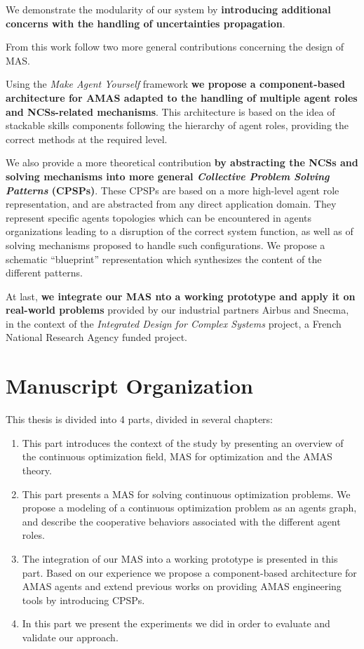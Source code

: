 We demonstrate the modularity of our system by \textbf{introducing additional concerns with the handling of uncertainties propagation}.

From this work follow two more general contributions concerning the design of MAS.

Using the \emph{Make Agent Yourself} framework \textbf{we propose a component-based architecture for AMAS adapted to the handling of multiple agent roles and NCSs-related mechanisms}. This architecture is based on the idea of stackable skills components following the hierarchy of agent roles, providing the correct methods at the required level.

We also provide a more theoretical contribution \textbf{by abstracting the NCSs and solving mechanisms into more general \textit{Collective Problem Solving Patterns} (CPSPs)}. These CPSPs are based on a more high-level agent role representation, and are abstracted from any direct application domain. They represent specific agents topologies which can be encountered in agents organizations leading to a disruption of the correct system function, as well as of solving mechanisms proposed to handle such configurations. We propose a schematic \enquote{blueprint} representation which synthesizes the content of the different patterns.

At last, \textbf{we integrate our MAS nto a working prototype and apply it on real-world problems} provided by our industrial partners Airbus and Snecma, in the context of the \emph{Integrated Design for Complex Systems} project, a French National Research Agency funded project.

\newpage
\section*{Manuscript Organization}

This thesis is divided into 4 parts, divided in several chapters:
\begin{enumerate}[P{a}rt I.] %
\item This part introduces the context of the study by presenting an overview of the continuous optimization field, MAS for optimization and the AMAS theory.
\item This part presents a MAS for solving continuous optimization problems. We propose a modeling of a continuous optimization problem as an agents graph, and describe the cooperative behaviors associated with the different agent roles.
\item The integration of our MAS into a working prototype is presented in this part. Based on our experience we propose a component-based architecture for AMAS agents and extend previous works on providing AMAS engineering tools by introducing CPSPs.
\item In this part we present the experiments we did in order to evaluate and validate our approach.
\end{enumerate}